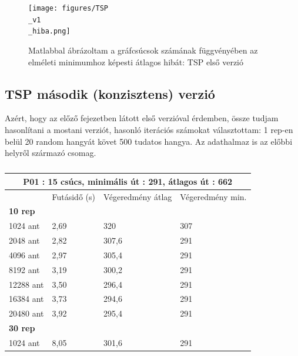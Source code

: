 \begin{figure}[htbp!]
	\centering
	\texttt{[image: figures/TSP\\\_v1\\\_hiba.png]}
	\caption{Matlabbal ábrázoltam a gráfcsúcsok számának függvényében az elméleti minimumhoz képesti átlagos hibát: TSP első verzió }
	\label{fig:TSP_v1_hiba}
\end{figure}

\subsection{TSP második (konzisztens) verzió}
Azért, hogy az előző fejezetben látott első verzióval érdemben, össze tudjam hasonlítani a mostani verziót, hasonló iterációs számokat választottam: 1 rep-en belül 20 random hangyát követ 500 tudatos hangya. Az adathalmaz is az előbbi \cite{TSPdataset} helyről származó csomag.

\begin{table}[ht!]
	\centering
	\begin{tabular}{|p{2cm}||p{3cm}|p{3.5cm}|p{3.5cm}|}
		\hline
		\multicolumn{4}{|c|}{P01 : 15 csúcs, minimális út : 291, átlagos út : 662} \\
		\hline
		& Futásidő (s) & Végeredmény átlag & Végeredmény min.\\
		\hline
		\textbf{10 rep} & & &\\
		1024 ant & 2,69 & 320  & 307\\
		2048 ant & 2,82 & 307,6 & 291\\
		4096 ant & 2,97 & 305,4 & 291\\
		8192 ant & 3,19 & 300,2 & 291\\
		12288 ant & 3,50 & 296,4 & 291\\
		16384 ant & 3,73 & 294,6 & 291\\
		20480 ant & 3,92 & 295,4 & 291\\
		\hline
		\textbf{30 rep} & & &\\
		1024 ant & 8,05 & 301,6 & 291\\
		\hline
	\end{tabular}
	\caption{}
	\label{table:TSPv2_15}
\end{table}

